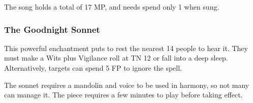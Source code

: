 \begin{multicols}{2}
The song holds a total of 17 MP, and needs spend only 1 when sung.

\subsubsection{The Goodnight Sonnet}

This powerful enchantment puts to rest the nearest 14 people to hear it.  They must make a Wits plus Vigilance roll at TN 12 or fall into a deep sleep.  Alternatively, targets can spend 5 FP to ignore the spell.

The sonnet requires a mandolin and voice to be used in harmony, so not many can manage it.  The piece requires a few minutes to play before taking effect.

\end{multicols}

